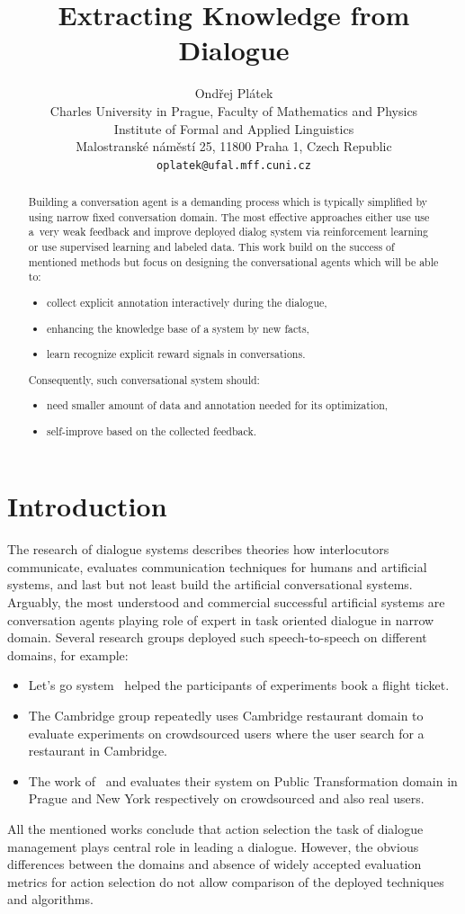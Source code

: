 \documentclass[11pt]{article}
\title{Extracting Knowledge from Dialogue}
\author{Ondřej Plátek \\
  Charles University in Prague, Faculty of Mathematics and Physics \\
  Institute of Formal and Applied Linguistics \\
  Malostranské náměstí 25, 11800 Praha 1, Czech Republic\\
  {\tt oplatek@ufal.mff.cuni.cz}\\}
\date{}
\begin{document}
\maketitle
\begin{abstract}
Building a conversation agent is a demanding process which is typically simplified by using narrow fixed conversation domain.
The most effective approaches either use use a~very weak feedback and improve deployed dialog system via reinforcement learning or use supervised learning and labeled data.
This work build on the success of mentioned methods but focus on designing the conversational agents which will be able to:
\begin{itemize}
    \item collect explicit annotation interactively during the dialogue,
    \item enhancing the knowledge base of a system by new facts,
    \item learn recognize explicit reward signals in conversations.
\end{itemize}
Consequently, such conversational system should:
\begin{itemize}
    \item need smaller amount of data and annotation needed for its optimization,
    \item self-improve based on the collected feedback.
\end{itemize}
\end{abstract}

\section{Introduction}
\label{sec:introduction}

The research of dialogue systems describes theories how interlocutors communicate, evaluates communication techniques for humans and artificial systems, and last but not least build the artificial conversational systems.
Arguably, the most understood and commercial successful artificial systems are conversation agents playing role of expert in task oriented dialogue in narrow domain.
Several research groups deployed such speech-to-speech on different domains, for example:
\begin{itemize}
    \item Let's go system~\cite{raux_lets_2005} helped the participants of experiments book a flight ticket.
    \item The Cambridge group repeatedly uses Cambridge restaurant domain to evaluate experiments on crowdsourced users where the user search for a restaurant in Cambridge.
    \item The work of~\cite{dusek_sequence2sequence_2016} and \cite{vejman_martin_development_2015} evaluates their system on Public Transformation domain in Prague and New York respectively on crowdsourced and also real users. 
\end{itemize}
All the mentioned works conclude that action selection the task of dialogue management plays central role in leading a dialogue.
However, the obvious differences between the domains and absence of widely accepted evaluation metrics for action selection do not allow comparison of the deployed techniques and algorithms.
\end{document}
